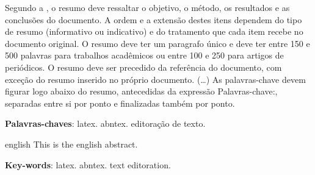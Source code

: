 
\setlength{\absparsep}{18pt} %
\begin{resumo}
 Segundo a , o resumo deve ressaltar o objetivo, o método, os resultados e as conclusões do documento. A ordem e a extensão destes itens dependem do tipo de resumo (informativo ou indicativo) e do  tratamento que cada item recebe no documento original. 
O resumo deve ter um paragrafo único e deve ter entre 150 e 500 palavras para trabalhos acadêmicos ou entre 100 e 250 para artigos de periódicos. 
O resumo deve ser precedido da referência do documento, com exceção do resumo inserido no  próprio documento. (\ldots) As palavras-chave devem figurar logo abaixo do resumo, antecedidas da expressão Palavras-chave:, separadas entre si por ponto e finalizadas também por ponto.

 \textbf{Palavras-chaves}: latex. abntex. editoração de texto.
\end{resumo}

\begin{resumo}[Abstract]
 \begin{otherlanguage*}{english}
   This is the english abstract.
   \vspace{\onelineskip}
 
   \noindent 
   \textbf{Key-words}: latex. abntex. text editoration.
 \end{otherlanguage*}
\end{resumo}